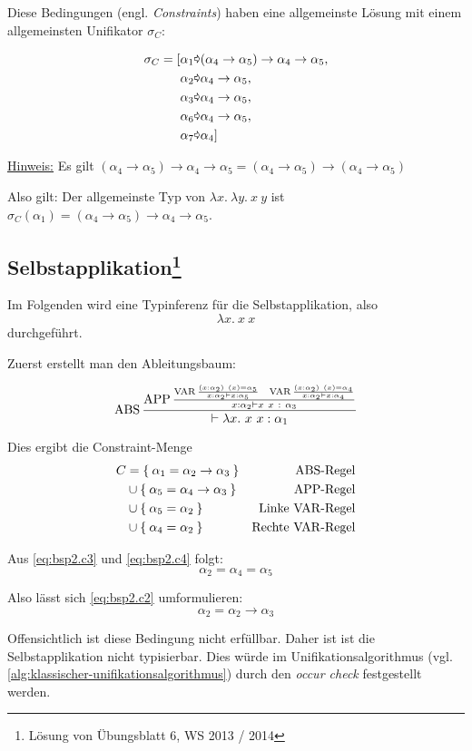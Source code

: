 Diese Bedingungen (engl. \textit{Constraints}) haben eine
allgemeinste Lösung mit einem allgemeinsten Unifikator $\sigma_C$:

\begin{align*}
	\sigma_C = [&\alpha_1 \Parr (\alpha_4 \rightarrow \alpha_5) \rightarrow \alpha_4 \rightarrow \alpha_5,\\
	&\alpha_2 \Parr \alpha_4 \rightarrow \alpha_5,\\
	&\alpha_3 \Parr \alpha_4 \rightarrow \alpha_5,\\
	&\alpha_6 \Parr \alpha_4 \rightarrow \alpha_5,\\
	&\alpha_7 \Parr \alpha_4]
\end{align*}

\underline{Hinweis:} Es gilt $(\alpha_4 \rightarrow \alpha_5) \rightarrow \alpha_4 \rightarrow \alpha_5 = (\alpha_4 \rightarrow \alpha_5) \rightarrow (\alpha_4 \rightarrow \alpha_5)$

Also gilt: Der allgemeinste Typ von $\lambda x.\ \lambda y.\ x\ y$ ist $\sigma_C (\alpha_1) = (\alpha_4 \rightarrow \alpha_5) \rightarrow \alpha_4 \rightarrow \alpha_5$.

\subsection[Selbstapplikation]{Selbstapplikation\footnote{Lösung von Übungsblatt 6, WS 2013 / 2014}}
Im Folgenden wird eine Typinferenz für die Selbstapplikation, also
\[\lambda x.\ x\ x\]
durchgeführt.

Zuerst erstellt man den Ableitungsbaum:

\[\ABS\frac{\APP \frac{\VAR \frac{(x:\alpha_2)\ (x) = \alpha_5}{x:\alpha_2 \vdash x: \alpha_5} \;\;\; \VAR \frac{(x:\alpha_2)\ (x) = \alpha_4}{x:\alpha_2 \vdash x:\alpha_4}}{x: \alpha_2 \vdash x\ x\ :\ \alpha_3}}{\vdash \lambda x.\ x\ x: \alpha_1}\]

Dies ergibt die Constraint-Menge
\begin{align}
	C&= \Set{\alpha_1 = \alpha_2 \rightarrow \alpha_3}    &\text{$\operatorname{ABS}$-Regel}\label{eq:bsp2.c1}\\ 
     &\cup \Set{\alpha_5 = \alpha_4 \rightarrow \alpha_3} &\text{$\operatorname{APP}$-Regel}\label{eq:bsp2.c2}\\
     &\cup \Set{\alpha_5 = \alpha_2}                      &\text{Linke $\operatorname{VAR}$-Regel}\label{eq:bsp2.c3}\\
     &\cup \Set{\alpha_4 = \alpha_2}                      &\text{Rechte $\operatorname{VAR}$-Regel}\label{eq:bsp2.c4}
\end{align}

Aus \cref{eq:bsp2.c3} und \cref{eq:bsp2.c4} folgt:
\[\alpha_2 = \alpha_4 = \alpha_5\]

Also lässt sich \cref{eq:bsp2.c2} umformulieren:
\[\alpha_2 = \alpha_2 \rightarrow \alpha_3\]

Offensichtlich ist diese Bedingung nicht erfüllbar. Daher ist ist die Selbstapplikation
nicht typisierbar. Dies würde im Unifikationsalgorithmus 
(vgl. \cref{alg:klassischer-unifikationsalgorithmus})
durch den \textit{occur check} festgestellt werden.